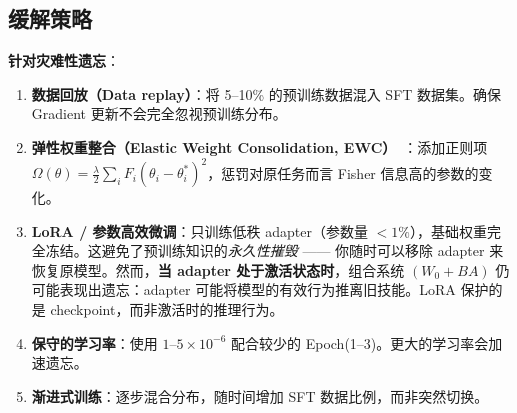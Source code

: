 \subsection{缓解策略}
\label{mitigation-strategies}

\textbf{针对灾难性遗忘}：

\begin{enumerate}
  \item \textbf{数据回放（Data replay）}：将 5--10\% 的预训练数据混入 SFT 数据集。确保 Gradient 更新不会完全忽视预训练分布。
  \item \textbf{弹性权重整合（Elastic Weight Consolidation, EWC）}~\cite{kirkpatrick2017overcoming}：添加正则项 $\Omega(\theta) = \frac{\lambda}{2}\sum_i F_i(\theta_i - \theta_i^*)^2$，惩罚对原任务而言 Fisher 信息高的参数的变化。
  \item \textbf{LoRA / 参数高效微调}：只训练低秩 adapter（参数量 $<1\%$），基础权重完全冻结。这避免了预训练知识的\emph{永久性摧毁} —— 你随时可以移除 adapter 来恢复原模型。然而，\textbf{当 adapter 处于激活状态时}，组合系统 $(W_0 + BA)$ 仍可能表现出遗忘：adapter 可能将模型的有效行为推离旧技能。LoRA 保护的是 checkpoint，而非激活时的推理行为。
  \item \textbf{保守的学习率}：使用 $1$--$5 \times 10^{-6}$ 配合较少的 Epoch(1--3)。更大的学习率会加速遗忘。
  \item \textbf{渐进式训练}：逐步混合分布，随时间增加 SFT 数据比例，而非突然切换。
\end{enumerate}


